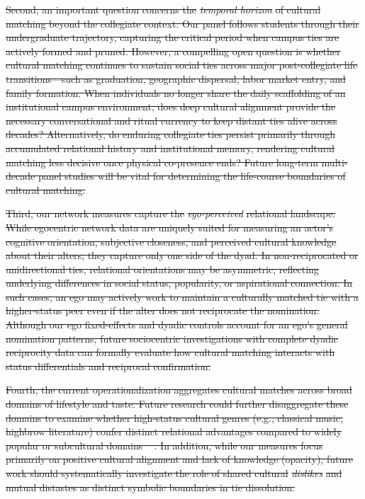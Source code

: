 \documentclass[12pt,letterpaper]{article} %
\providecommand{\DIFdel}[1]{{\protect\color{red}\sout{#1}}}                      %
\begin{document}
\DIFdel{Second, an important question concerns the }\textit{\DIFdel{temporal horizon}} %
\DIFdel{of cultural matching beyond the collegiate context. Our panel follows students through their undergraduate trajectory, capturing the critical period when campus ties are actively formed and pruned. However, a compelling open question is whether cultural matching continues to sustain social ties across major post-collegiate life transitions---such as graduation, geographic dispersal, labor market entry, and family formation. When individuals no longer share the daily scaffolding of an institutional campus environment, does deep cultural alignment provide the necessary conversational and ritual currency to keep distant ties alive across decades? Alternatively, do enduring collegiate ties persist primarily through accumulated relational history and institutional memory, rendering cultural matching less decisive once physical co-presence ends? Future long-term multi-decade panel studies will be vital for determining the life-course boundaries of cultural matching.
}%

\DIFdel{Third, our network measures capture the }\textit{\DIFdel{ego-perceived}} %
\DIFdel{relational landscape. While egocentric network data are uniquely suited for measuring an actor's cognitive orientation, subjective closeness, and perceived cultural knowledge about their alters, they capture only one side of the dyad. In non-reciprocated or unidirectional ties, relational orientations may be asymmetric, reflecting underlying differences in social status, popularity, or aspirational connection. In such cases, an ego may actively work to maintain a culturally matched tie with a higher-status peer even if the alter does not reciprocate the nomination. Although our ego fixed-effects and dyadic controls account for an ego's general nomination patterns, future sociocentric investigations with complete dyadic reciprocity data can formally evaluate how cultural matching interacts with status differentials and reciprocal confirmation.
}%

\DIFdel{Fourth, the current operationalization aggregates cultural matches across broad domains of lifestyle and taste. Future research could further disaggregate these domains to examine whether high-status cultural genres (e.g., classical music, highbrow literature) confer distinct relational advantages compared to widely popular or subcultural domains \mbox{%
\citep{dimaggio1987}}\hskip0pt%
. In addition, while our measures focus primarily on positive cultural alignment and lack of knowledge (opacity), future work should systematically investigate the role of shared cultural }\textit{\DIFdel{dislikes}} %
\DIFdel{and mutual distastes as distinct symbolic boundaries in tie dissolution.
}%
\end{document}
